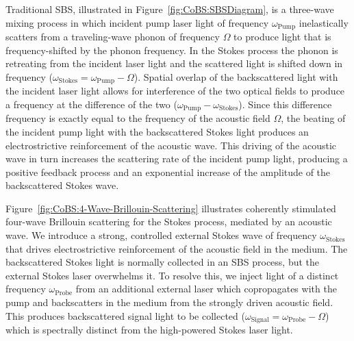 Traditional \ac{SBS}, illustrated in Figure~\ref{fig:CoBS:SBSDiagram}, is a three-wave mixing process in which incident pump laser light of frequency \(\omega_{\mathrm{Pump}}\) inelastically scatters from a traveling-wave phonon of frequency \(\Omega\) to produce light that is frequency-shifted by the phonon frequency. In the Stokes process the phonon is retreating from the incident laser light and the scattered light is shifted down in frequency (\(\omega_{\mathrm{Stokes}} = \omega_{\mathrm{Pump}} - \Omega\)). Spatial overlap of the backscattered light with the incident laser light allows for interference of the two optical fields to produce a frequency at the difference of the two (\(\omega_{\mathrm{Pump}} - \omega_{\mathrm{Stokes}}\)). Since this difference frequency is exactly equal to the frequency of the acoustic field \(\Omega\), the beating of the incident pump light with the backscattered Stokes light produces an electrostrictive reinforcement of the acoustic wave. This driving of the acoustic wave in turn increases the scattering rate of the incident pump light, producing a positive feedback process and an exponential increase of the amplitude of the backscattered Stokes wave.

Figure~\ref{fig:CoBS:4-Wave-Brillouin-Scattering} illustrates coherently stimulated four-wave Brillouin scattering for the Stokes process, mediated by an acoustic wave. We introduce a strong, controlled external Stokes wave of frequency \(\omega_{\mathrm{Stokes}}\) that drives electrostrictive reinforcement of the acoustic field in the medium. The backscattered Stokes light is normally collected in an \ac{SBS} process, but the external Stokes laser overwhelms it. To resolve this, we inject light of a distinct frequency \(\omega_{\mathrm{Probe}}\) from an additional external laser which copropagates with the pump and backscatters in the medium from the strongly driven acoustic field. This produces backscattered signal light to be collected (\(\omega_{\mathrm{Signal}} = \omega_{\mathrm{Probe}} - \Omega\)) which is spectrally distinct from the high-powered Stokes laser light.

